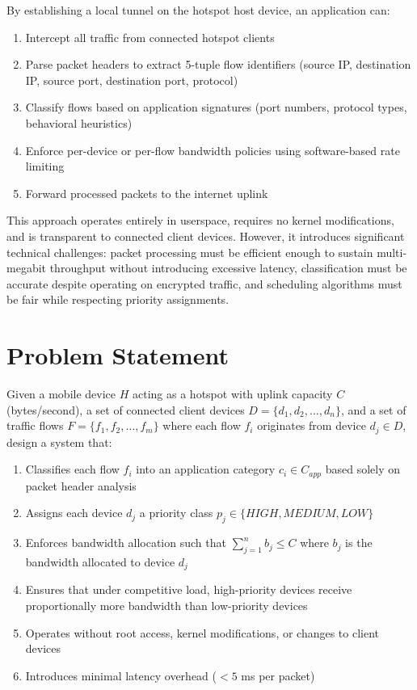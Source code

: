 By establishing a local \vpn tunnel on the hotspot host device, an application can:

\begin{enumerate}[leftmargin=*]
    \item Intercept all traffic from connected hotspot clients
    \item Parse packet headers to extract 5-tuple flow identifiers (source IP, destination IP, source port, destination port, protocol)
    \item Classify flows based on application signatures (port numbers, protocol types, behavioral heuristics)
    \item Enforce per-device or per-flow bandwidth policies using software-based rate limiting
    \item Forward processed packets to the internet uplink
\end{enumerate}

This approach operates entirely in userspace, requires no kernel modifications, and is transparent to connected client devices. However, it introduces significant technical challenges: packet processing must be efficient enough to sustain multi-megabit throughput without introducing excessive latency, classification must be accurate despite operating on encrypted traffic, and scheduling algorithms must be fair while respecting priority assignments.

\section{Problem Statement}
\label{sec:problem-statement}

\begin{definition}
Given a mobile device $H$ acting as a hotspot with uplink capacity $C$ (bytes/second), a set of connected client devices $D = \{d_1, d_2, \ldots, d_n\}$, and a set of traffic flows $F = \{f_1, f_2, \ldots, f_m\}$ where each flow $f_i$ originates from device $d_j \in D$, design a system that:

\begin{enumerate}
    \item Classifies each flow $f_i$ into an application category $c_i \in C_{app}$ based solely on packet header analysis
    \item Assigns each device $d_j$ a priority class $p_j \in \{HIGH, MEDIUM, LOW\}$
    \item Enforces bandwidth allocation such that $\sum_{j=1}^{n} b_j \leq C$ where $b_j$ is the bandwidth allocated to device $d_j$
    \item Ensures that under competitive load, high-priority devices receive proportionally more bandwidth than low-priority devices
    \item Operates without root access, kernel modifications, or changes to client devices
    \item Introduces minimal latency overhead ($< 5$ ms per packet)
\end{enumerate}
\end{definition}

